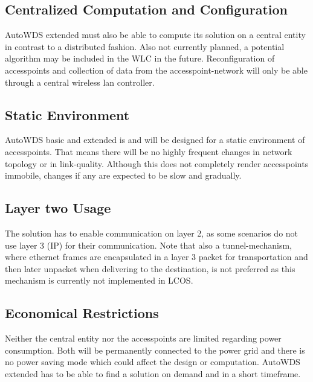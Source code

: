     \subsection{Centralized Computation and Configuration}
      AutoWDS extended must also be able to compute its solution on a central entity in contrast to a distributed fashion.
      Also not currently planned, a potential algorithm may be included in the WLC in the future.
      Reconfiguration of accesspoints and collection of data from the accesspoint-network will only be able through a central wireless lan controller.
      
    \subsection{Static Environment}
      AutoWDS basic and extended is and will be designed for a static environment of accesspoints. That means there will be no highly frequent changes in
      network topology or in link-quality. Although this does not completely render accesspoints immobile, changes if any are expected to be slow and gradually.
      
    \subsection{Layer two Usage}
      The solution has to enable communication on layer 2, as some scenarios do not use layer 3 (IP) for their communication.
      Note that also a tunnel-mechanism, where ethernet frames are encapsulated in a layer 3 packet for transportation and then later unpacket when delivering to the destination,
      is not preferred as this mechanism is currently not implemented in LCOS.
    
    \subsection{Economical Restrictions}
      Neither the central entity nor the accesspoints are limited regarding power consumption. 
      Both will be permanently connected to the power grid and there is no power saving mode which could affect the design or computation.
      AutoWDS extended has to be able to find a solution on demand and in a short timeframe.
  